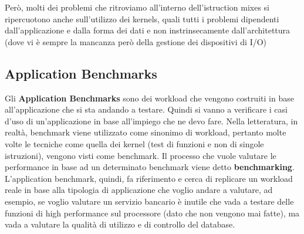 Però, molti dei problemi che ritroviamo all'interno dell'istruction mixes si ripercuotono anche sull'utilizzo dei kernels, quali tutti i problemi dipendenti dall'applicazione e dalla forma dei dati e non instrinsecamente dall'architettura (dove vi è sempre la mancanza però della gestione dei dispositivi di I/O)

\subsection{Application Benchmarks}
Gli \textbf{Application Benchmarks} sono dei workload che vengono costruiti in base all'applicazione che si sta andando a testare. Quindi si vanno a verificare i casi d'uso di un'applicazione in base all'impiego che ne devo fare. Nella letteratura, in realtà, benchmark viene utilizzato come sinonimo di workload, pertanto molte volte le tecniche come quella dei kernel (test di funzioni e non di singole istruzioni), vengono visti come benchmark. Il processo che vuole valutare le performance in base ad un determinato benchmark viene detto \textbf{benchmarking}. L'application benchmark, quindi, fa riferimento e cerca di replicare un workload reale in base alla tipologia di applicazione che voglio andare a valutare, ad esempio, se voglio valutare un servizio bancario è inutile che vada a testare delle funzioni di high performance sul processore (dato che non vengono mai fatte), ma vada a valutare la qualità di utilizzo e di controllo del database. 

